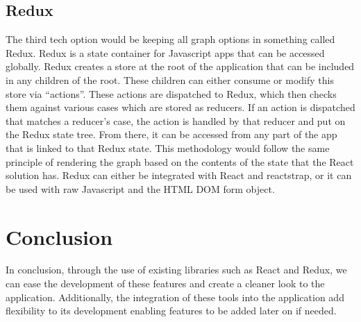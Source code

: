 \documentclass[journal,10pt,onecolumn,compsoc]{IEEEtran}
\begin{document}
\subsection{Redux}
The third tech option would be keeping all graph options in something called Redux. Redux is a state container for Javascript apps that can be accessed globally. Redux creates a store at the root of the application that can be included in any children of the root. These children can either consume or modify this store via “actions”. These actions are dispatched to Redux, which then checks them against various cases which are stored as reducers. If an action is dispatched that matches a reducer’s case, the action is handled by that reducer and put on the Redux state tree. From there, it can be accessed from any part of the app that is linked to that Redux state. This methodology would follow the same principle of rendering the graph based on the contents of the state that the React solution has. Redux can either be integrated with React and reactstrap, or it can be used with raw Javascript and the HTML DOM form object.

\section{Conclusion}
In conclusion, through the use of existing libraries such as React and Redux, we can ease the development of these features and create a cleaner look to the application. Additionally, the integration of these tools into the application add flexibility to its development enabling features to be added later on if needed.
\end{document}
